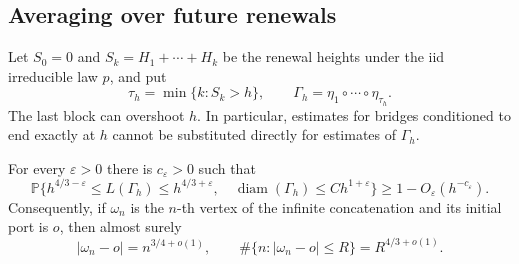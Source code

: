 \subsection{Averaging over future renewals}

Let $S_0=0$ and $S_k=H_1+\cdots+H_k$ be the renewal heights under the
iid irreducible law $p$, and put
\[
 \tau_h=\min\{k:S_k>h\},\qquad
 \Gamma_h=\eta_1\circ\cdots\circ\eta_{\tau_h}.
\]
The last block can overshoot $h$. In particular, estimates for bridges
conditioned to end exactly at $h$ cannot be substituted directly for
estimates of $\Gamma_h$.

\begin{proposition}\label{R:alt:g:infinite}
For every $\varepsilon>0$ there is $c_\varepsilon>0$ such that
\[
 \mathbb P\{h^{4/3-\varepsilon}\le L(\Gamma_h)
            \le h^{4/3+\varepsilon},\quad
             \operatorname{diam}(\Gamma_h)\le Ch^{1+\varepsilon}\}
       \ge1-O_\varepsilon(h^{-c_\varepsilon}).
\]
Consequently, if $\omega_n$ is the $n$-th vertex of the infinite
concatenation and its initial port is $o$, then almost surely
\[
 |\omega_n-o|=n^{3/4+o(1)},\qquad
 \#\{n:|\omega_n-o|\le R\}=R^{4/3+o(1)}.
\]
\end{proposition}
